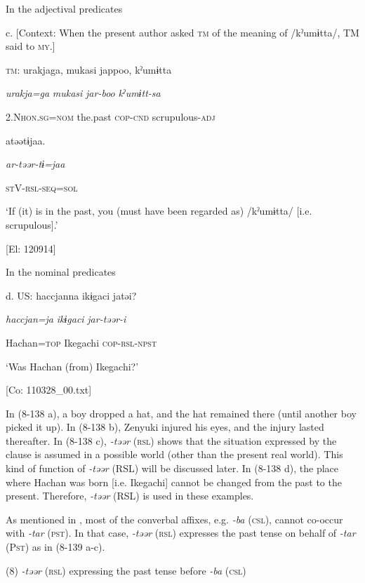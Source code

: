   In the adjectival predicates

  c.  [Context: When the present author asked \textsc{tm} of the meaning of /kˀumɨtta/, TM said to \textsc{my}.]

    \textsc{tm}:  urakjaga,  mukasi  jappoo,  kˀumɨtta

      \textit{urakja=ga}  \textit{mukasi}  \textit{jar-boo}  \textit{kˀumɨtt-sa}

      2.N\textsc{hon}.\textsc{sg}=\textsc{nom}  the.past  \textsc{cop}-\textsc{cnd}  scrupulous-\textsc{adj}

      atəətɨjaa.

      \textit{ar-təər-tɨ=jaa}

      \textsc{st}V-\textsc{rsl}-\textsc{seq}=\textsc{sol}

      ‘If (it) is in the past, you (must have been regarded as) /kˀumɨtta/ [i.e. scrupulous].’

      [El: 120914]

  In the nominal predicates

  d.  US:  haccjanna  ikɨgaci  jatəi?

      \textit{haccjan=ja}  \textit{ikɨgaci}  \textit{jar-təər{}-i}

      Hachan=\textsc{top}  Ikegachi  \textsc{cop}-\textsc{rsl}-\textsc{npst}

      ‘Was Hachan (from) Ikegachi?’

      [Co: 110328\_00.txt]

In (8-138 a), a boy dropped a hat, and the hat remained there (until another boy picked it up). In (8-138 b), Zenyuki injured his eyes, and the injury lasted thereafter. In (8-138 c), \textit{{}-təər} (\textsc{rsl}) shows that the situation expressed by the clause is assumed in a possible world (other than the present real world). This kind of function of \textit{{}-təər} (RSL) will be discussed later. In (8-138 d), the place where Hachan was born [i.e. Ikegachi] cannot be changed from the past to the present. Therefore, \textit{-təər} (RSL) is used in these examples.

  As mentioned in , most of the converbal affixes, e.g. \textit{{}-ba} (\textsc{csl}), cannot co-occur with \textit{{}-tar} (\textsc{pst}). In that case, \textit{{}-təər} (\textsc{rsl}) expresses the past tense on behalf of \textit{{}-tar} (P\textsc{st}) as in (8-139 a-c).

(8)  \textit{{}-təər} (\textsc{rsl}) expressing the past tense before \textit{{}-ba} (\textsc{csl})

